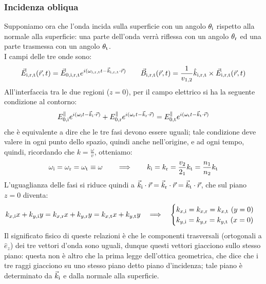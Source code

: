 \documentclass[]{article}
\begin{document}
\subsubsection{Incidenza obliqua}

Supponiamo ora che l'onda incida sulla superficie con un angolo $ \theta_{\text{i}} $ rispetto alla normale alla superficie: una parte dell'onda verrà riflessa con un angolo $ \theta_{\text{r}} $ ed una parte trasmessa con un angolo $ \theta_{\text{t}} $. \\ 
I campi delle tre onde sono:
\begin{equation}
	\vec{E}_{\text{i},\text{r},\text{t}}(\vec{r},t) = \vec{E}_{0,\text{i},\text{r},\text{t}} e^{i(\omega_{\text{i},\text{r},\text{t}} t - \vec{k}_{\text{i},\text{r},\text{t}} \cdot \vec{r})} \qquad \vec{B}_{\text{i},\text{r},\text{t}}(\vec{r},t) = \frac{1}{v_{1,2}} \hat{k}_{\text{i},\text{r},\text{t}} \times \vec{E}_{\text{i},\text{r},\text{t}}(\vec{r},t)
	\label{eq:60}
\end{equation}
All'interfaccia tra le due regioni ($ z = 0 $), per il campo elettrico si ha la seguente condizione al contorno:
\begin{equation}
	E^{\parallel}_{0,\text{i}} e^{i(\omega_{\text{i}} t - \vec{k}_{\text{i}} \cdot \vec{r})} + E^{\parallel}_{0,\text{r}} e^{i(\omega_{\text{r}} t - \vec{k}_{\text{r}} \cdot \vec{r})} = E^{\parallel}_{0,\text{t}} e^{i(\omega_{\text{t}} t - \vec{k}_{\text{t}} \cdot \vec{r})}
	\label{eq:61}
\end{equation}
che è equivalente a dire che le tre fasi devono essere uguali; tale condizione deve valere in ogni punto dello spazio, quindi anche nell'origine, e ad ogni tempo, quindi, ricordando che $ k = \frac{\omega}{v} $, otteniamo:
\begin{equation}
	\omega_{\text{i}} = \omega_{\text{r}} = \omega_{\text{t}} \equiv \omega \qquad\Longrightarrow\qquad k_{\text{i}} = k_{\text{r}} = \frac{v_2}{2_1} k_{\text{t}} = \frac{n_1}{n_2} k_{\text{t}}
	\label{eq:62}
\end{equation}
L'uguaglianza delle fasi si riduce quindi a $ \vec{k}_{\text{i}}\cdot\vec{r} = \vec{k}_{\text{r}}\cdot\vec{r} = \vec{k}_{\text{t}}\cdot\vec{r} $, che sul piano $ z = 0 $ diventa:
\begin{equation}
	k_{x,\text{i}} x + k_{y,\text{i}}  y = k_{x,\text{r}} x + k_{y,\text{r}} y = k_{x,\text{t}} x + k_{y,\text{t}} y \quad\Longrightarrow\quad
	\begin{cases}
		k_{x,\text{i}} = k_{x,\text{r}} = k_{x,\text{t}} \,\,(y = 0) \\ 
		k_{y,\text{i}} = k_{y,\text{r}} = k_{y,\text{t}} \,\,(x = 0)
	\end{cases}
	\label{eq:63}
\end{equation}
Il significato fisico di queste relazioni è che le componenti trasversali (ortogonali a $ \hat{e}_z $) dei tre vettori d'onda sono uguali, dunque questi vettori giacciono sullo stesso piano: questa non è altro che la prima legge dell'ottica geometrica, che dice che i tre raggi giacciono su uno stesso piano detto piano d'incidenza; tale piano è determinato da $ \vec{k}_{\text{i}} $ e dalla normale alla superficie. \\ 
\end{document}

